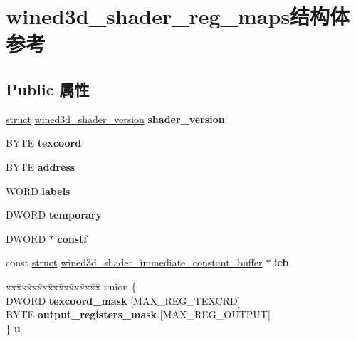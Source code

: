 \hypertarget{structwined3d__shader__reg__maps}{}\section{wined3d\+\_\+shader\+\_\+reg\+\_\+maps结构体 参考}
\label{structwined3d__shader__reg__maps}
\subsection*{Public 属性}
\begin{DoxyCompactItemize}
\item 
\mbox{\label{structwined3d__shader__reg__maps_a2fbcefda55a260cb807d6a49efb9e167}} 
\hyperlink{interfacestruct}{struct} \hyperlink{structwined3d__shader__version}{wined3d\+\_\+shader\+\_\+version} {\bfseries shader\+\_\+version}
\item 
\mbox{\label{structwined3d__shader__reg__maps_aca3f305c8fcef4e6f3eda3ca11f64907}} 
B\+Y\+TE {\bfseries texcoord}
\item 
\mbox{\label{structwined3d__shader__reg__maps_aa3222d614069206b26e46cfc891fc9cc}} 
B\+Y\+TE {\bfseries address}
\item 
\mbox{\label{structwined3d__shader__reg__maps_a3da6db6f83f2fbe63ceb60069bb2ab31}} 
W\+O\+RD {\bfseries labels}
\item 
\mbox{\label{structwined3d__shader__reg__maps_a77b32e3f46bcccedf82a013abe0380dc}} 
D\+W\+O\+RD {\bfseries temporary}
\item 
\mbox{\label{structwined3d__shader__reg__maps_ae2b39d18e1d94eb659a58612c44144cf}} 
D\+W\+O\+RD $\ast$ {\bfseries constf}
\item 
\mbox{\label{structwined3d__shader__reg__maps_a6f67bacb8e0e6c7d99f06e7b23f46f9d}} 
const \hyperlink{interfacestruct}{struct} \hyperlink{structwined3d__shader__immediate__constant__buffer}{wined3d\+\_\+shader\+\_\+immediate\+\_\+constant\+\_\+buffer} $\ast$ {\bfseries icb}
\item 
\mbox{\label{structwined3d__shader__reg__maps_a87952e3407d27bf234eac321c5458db4}} 
\begin{tabbing}
xx\=xx\=xx\=xx\=xx\=xx\=xx\=xx\=xx\=\kill
union \{\\
\>DWORD {\bfseries texcoord\_mask} \mbox{[}MAX\_REG\_TEXCRD\mbox{]}\\
\>BYTE {\bfseries output\_registers\_mask} \mbox{[}MAX\_REG\_OUTPUT\mbox{]}\\
\} {\bfseries u}\\


\end{tabbing}
\end{DoxyCompactItemize}
